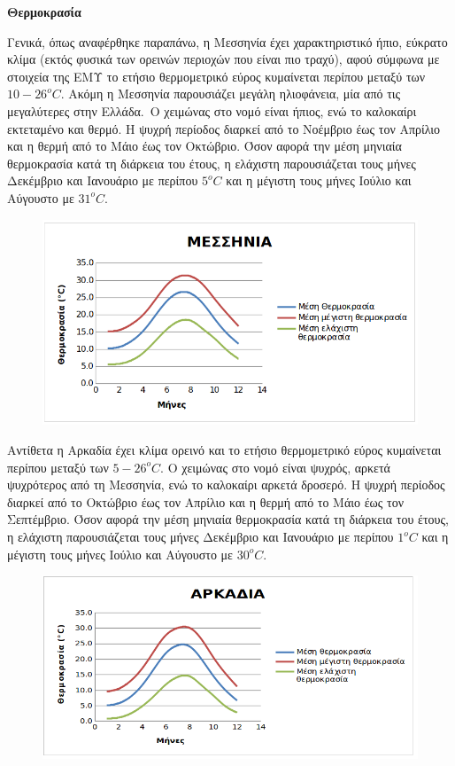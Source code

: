 \documentclass[12pt]{article}
\begin{document}
	\textbf{Θερμοκρασία}
	
	Γενικά, όπως αναφέρθηκε παραπάνω, η Μεσσηνία έχει χαρακτηριστικό ήπιο, εύκρατο κλίμα (εκτός φυσικά των ορεινών περιοχών που είναι πιο τραχύ), αφού σύμφωνα με στοιχεία της ΕΜΥ το ετήσιο θερμομετρικό εύρος κυμαίνεται περίπου μεταξύ των $10 - 26^o C$.  Ακόμη η Μεσσηνία παρουσιάζει μεγάλη ηλιοφάνεια, μία από τις μεγαλύτερες στην Ελλάδα. Ο χειμώνας στο νομό είναι ήπιος, ενώ το καλοκαίρι εκτεταμένο και θερμό. Η ψυχρή περίοδος διαρκεί από το Νοέμβριο έως τον Απρίλιο και η θερμή από το Μάιο έως τον Οκτώβριο. Όσον αφορά την μέση μηνιαία θερμοκρασία κατά τη διάρκεια του έτους, η ελάχιστη παρουσιάζεται τους μήνες Δεκέμβριο και Ιανουάριο με περίπου $5^o C$ και η μέγιστη τους μήνες Ιούλιο και Αύγουστο με $31^o C$. 
	
	\begin{figure} [H]
		\begin{center}
			\includegraphics [scale = 0.80] {messinia4.png}
		\end{center}
	\end{figure}

	Αντίθετα η Αρκαδία έχει κλίμα ορεινό και το ετήσιο θερμομετρικό εύρος κυμαίνεται περίπου μεταξύ των $5 - 26^o C$. Ο χειμώνας στο νομό είναι ψυχρός, αρκετά ψυχρότερος από τη Μεσσηνία, ενώ το καλοκαίρι αρκετά δροσερό. Η ψυχρή περίοδος διαρκεί από το Οκτώβριο έως τον Απρίλιο και η θερμή από το Μάιο έως τον Σεπτέμβριο. Όσον αφορά την μέση μηνιαία θερμοκρασία κατά τη διάρκεια του έτους, η ελάχιστη παρουσιάζεται τους μήνες Δεκέμβριο και Ιανουάριο με περίπου $1^o C$ και η μέγιστη τους μήνες Ιούλιο και Αύγουστο με $30^o C$. 
	
	\begin{figure} [H]
		\begin{center}
			\includegraphics [scale = 0.80] {arkadia4.png}
		\end{center}
	\end{figure}
\end{document}
